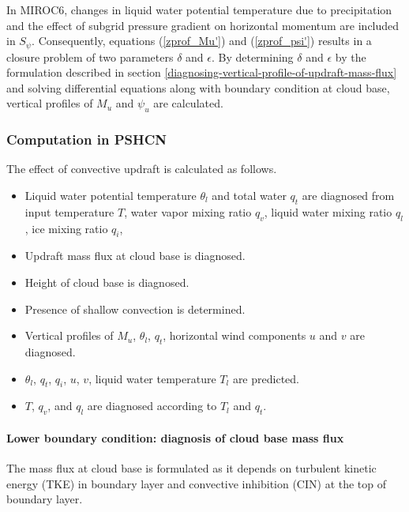 In MIROC6, changes in liquid water potential temperature due to precipitation and the effect of subgrid pressure gradient on horizontal momentum are included in $S_{\psi}$.
Consequently, equations (\ref{zprof_Mu'}) and (\ref{zprof_psi'}) results in a closure problem of two parameters $\delta$ and $\epsilon$.
By determining $\delta$ and $\epsilon$ by the formulation described in section \ref{diagnosing-vertical-profile-of-updraft-mass-flux} 
and solving differential equations along with boundary condition at cloud base, vertical profiles of $M_u$ and $\psi_u$ are calculated.

\subsubsection{Computation in PSHCN}\label{computation-in-PSHCN}

The effect of convective updraft is calculated as follows.
\begin{itemize}
    \item Liquid water potential temperature $\theta_l$ and total water $q_t$ are diagnosed from input temperature $T$, water vapor mixing ratio $q_v$, liquid water mixing ratio $q_l$, ice mixing ratio $q_i$, 
    \item Updraft mass flux at cloud base is diagnosed.
    \item Height of cloud base is diagnosed.
    \item Presence of shallow convection is determined.
    \item Vertical profiles of $M_u$, $\theta_l$, $q_t$, horizontal wind components $u$ and $v$ are diagnosed.
    \item $\theta_l$, $q_t$, $q_i$, $u$, $v$, liquid water temperature $T_l$ are predicted.
    \item $T$, $q_v$, and $q_l$ are diagnosed according to $T_l$ and $q_t$.
\end{itemize}

\paragraph{Lower boundary condition: diagnosis of cloud base mass flux}\label{lower-boundary-condition}

The mass flux at cloud base is formulated as it depends on turbulent kinetic energy (TKE) in boundary layer and convective inhibition (CIN) at the top of boundary layer.

